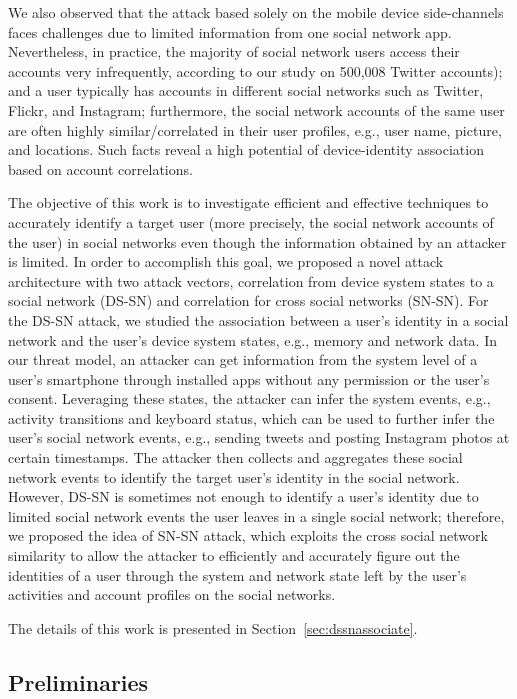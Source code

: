 \documentclass[letterpaper,12pt]{article}
\begin{document}
We also observed that the attack based solely on the mobile device side-channels faces challenges due to limited information from one social network app. Nevertheless, in practice, the majority of social network users access their accounts very infrequently, according to our study on 500,008 Twitter accounts); and a user typically has accounts in different social networks such as Twitter, Flickr, and Instagram; furthermore, the social network accounts of the same user are often highly similar/correlated in their user profiles, e.g., user name, picture, and locations. Such facts reveal a high potential of device-identity association based on account correlations. 

The objective of this work is to investigate efficient and effective techniques to accurately identify a target user (more precisely, the social network accounts of the user) in social networks even though the information obtained by an attacker is limited. 
In order to accomplish this goal, we proposed a novel attack architecture with two attack vectors, correlation from device system states to a social network (DS-SN) and correlation for cross social networks (SN-SN). For the DS-SN attack, we studied the association between a user's identity in a social network and the user's device system states, e.g., memory and network data. In our threat model, an attacker can get information from the system level of a user's smartphone through installed apps without any permission or the user's consent. Leveraging these states, the attacker can infer the system events, e.g., activity transitions and keyboard status, which can be used to further infer the user's social network events, e.g., sending tweets and posting Instagram photos at certain timestamps. The attacker then collects and aggregates these social network events to identify the target user's identity in the social network. However, DS-SN is sometimes not enough to identify a user's identity due to limited social network events the user leaves in a single social network; therefore, we proposed the idea of SN-SN attack, which exploits the cross social network similarity to allow the attacker to efficiently and accurately figure out the identities of a user through the system and network state left by the user's activities and account profiles on the social networks. 

The details of this work is presented in Section~\ref{sec:dssnassociate}. 


   \newpage
      \begin{singlespace}
           \section{Preliminaries}
      \end{singlespace}
   \label{sec:preliminaries}
\end{document}
